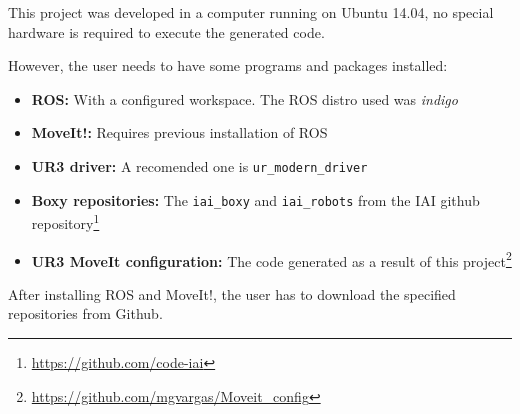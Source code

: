 This project was developed in a computer running on Ubuntu 14.04, no special hardware is required to execute the generated code.

However, the user needs to have some programs and packages installed: 
\begin{itemize}
	\item \textbf{ROS:} With a configured workspace. The ROS distro used was \textit{indigo}
	\item \textbf{MoveIt!:} Requires previous installation of ROS
	\item \textbf{UR3 driver:} A recomended one is \texttt{ur\_modern\_driver}
	\item \textbf{Boxy repositories:} The \texttt{iai\_boxy} and \texttt{iai\_robots} from the IAI github repository\footnote{\url{https://github.com/code-iai}}
	\item \textbf{UR3 MoveIt configuration:} The code generated as a result of this project\footnote{\url{https://github.com/mgvargas/Moveit_config}}
\end{itemize}


After installing ROS and MoveIt!, the user has to download the specified repositories from Github. 

